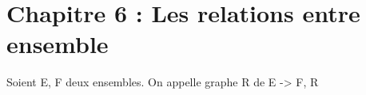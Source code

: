 \documentclass[12pt]{article}
\begin{document}
    \chapter{Chapitre 6 : Les relations entre ensemble}
    \begin{definition}
        Soient E, F deux ensembles. On appelle graphe R de E -> F, R 
    \end{definition}
\end{document}
